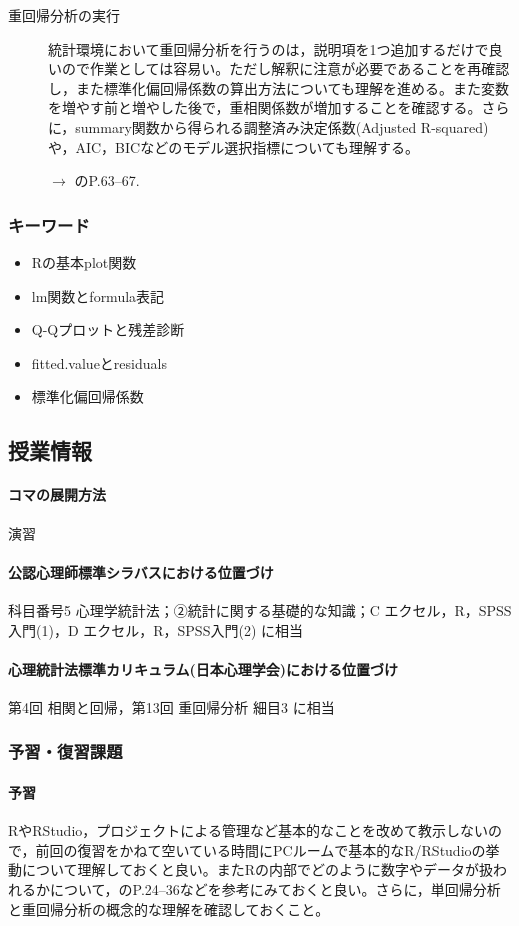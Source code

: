 \begin{description}
	\item[重回帰分析の実行] 統計環境において重回帰分析を行うのは，説明項を1つ追加するだけで良いので作業としては容易い。ただし解釈に注意が必要であることを再確認し，また標準化偏回帰係数の算出方法についても理解を進める。また変数を増やす前と増やした後で，重相関係数が増加することを確認する。さらに，summary関数から得られる調整済み決定係数(Adjusted R-squared)や，AIC，BICなどのモデル選択指標についても理解する。
	      \begin{flushright}
		      $\to$ \textcite{kosugi2018}のP.63--67.
	      \end{flushright}

\end{description}
\subsubsection{キーワード}
\begin{itemize}
	\item Rの基本plot関数
	\item lm関数とformula表記
	\item Q-Qプロットと残差診断
	\item fitted.valueとresiduals
	\item 標準化偏回帰係数
\end{itemize}
\subsection{授業情報}
\paragraph{コマの展開方法}
演習
\paragraph{公認心理師標準シラバスにおける位置づけ}
科目番号5 心理学統計法；②統計に関する基礎的な知識；C エクセル，R，SPSS入門(1)，D エクセル，R，SPSS入門(2) に相当
\paragraph{心理統計法標準カリキュラム(日本心理学会)における位置づけ}
第4回 相関と回帰，第13回 重回帰分析 細目3 に相当
\subsubsection{予習・復習課題}
\paragraph{予習}
RやRStudio，プロジェクトによる管理など基本的なことを改めて教示しないので，前回の復習をかねて空いている時間にPCルームで基本的なR/RStudioの挙動について理解しておくと良い。またRの内部でどのように数字やデータが扱われるかについて，\textcite{kosugi2019}のP.24--36などを参考にみておくと良い。さらに，単回帰分析と重回帰分析の概念的な理解を確認しておくこと。

